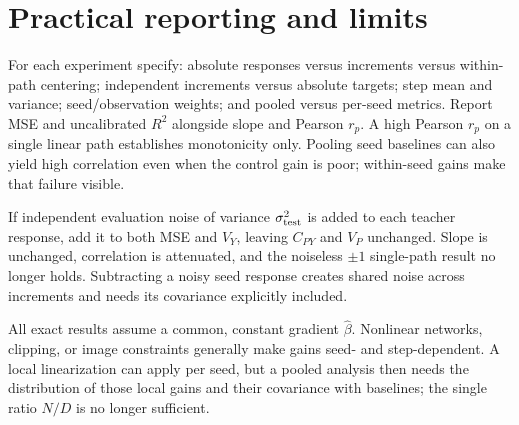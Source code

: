 \documentclass[11pt]{article}
\newcommand{\bhat}{\hat{\beta}}
\begin{document}
\section{Practical reporting and limits}
For each experiment specify: absolute responses versus increments versus
within-path centering; independent increments versus absolute targets;
step mean and variance; seed/observation weights; and pooled versus per-seed
metrics. Report MSE and uncalibrated $R^2$ alongside slope and Pearson $r_p$.
A high Pearson $r_p$ on a single linear path establishes monotonicity only.
Pooling seed baselines can also yield high correlation even when the control
gain is poor; within-seed gains make that failure visible.

If independent evaluation noise of variance $\sigma_{\rm test}^2$ is added
to each teacher response, add it to both MSE and $V_Y$, leaving $C_{PY}$ and
$V_P$ unchanged. Slope is unchanged, correlation is attenuated, and the
noiseless $\pm1$ single-path result no longer holds. Subtracting a noisy seed
response creates shared noise across increments and needs its covariance
explicitly included.

All exact results assume a common, constant gradient $\bhat$. Nonlinear
networks, clipping, or image constraints generally make gains seed- and
step-dependent. A local linearization can apply per seed, but a pooled
analysis then needs the distribution of those local gains and their
covariance with baselines; the single ratio $N/D$ is no longer sufficient.
\end{document}
